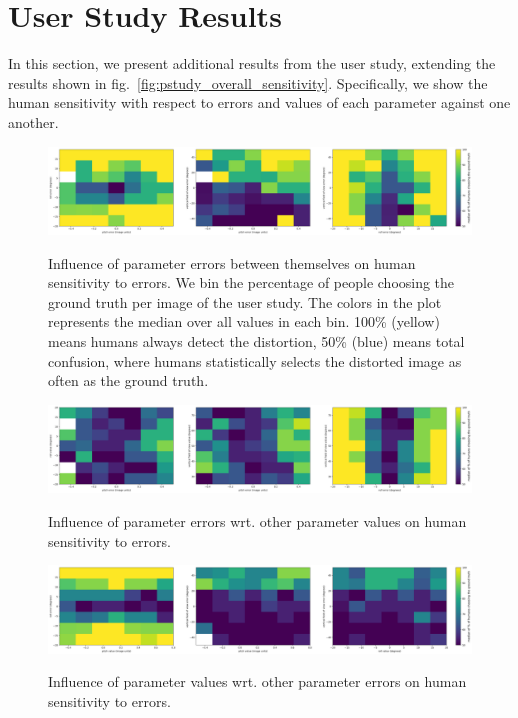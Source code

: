 \clearpage

\FloatBarrier

\protect\hypertarget{studyresults}{}{}

\hypertarget{user-study-results}{%
\section{User Study Results}\label{user-study-results}}

In this section, we present additional results from the user study,
extending the results shown in fig.~\ref{fig:pstudy_overall_sensitivity}. Specifically, we show the human
sensitivity with respect to errors and values of each parameter against
one another.

\begin{figure}[!ht]
\centering
\includegraphics[width=\linewidth]{study_results/hist2d_image_units_error_error.png}\\
\caption{Influence of parameter errors between themselves on human
sensitivity to errors. We bin the percentage of people choosing the
ground truth per image of the user study. The colors in the plot
represents the median over all values in each bin. 100\% (yellow) means
humans always detect the distortion, 50\% (blue) means total confusion,
where humans statistically selects the distorted image as often as the
ground truth.}
\end{figure}

\begin{figure}[!ht]
\centering
\includegraphics[width=\linewidth]{study_results/hist2d_image_units_error_value.png}\\
\caption{Influence of parameter errors wrt. other parameter values on
human sensitivity to errors.}
\end{figure}

\begin{figure}[!ht]
\centering
\includegraphics[width=\linewidth]{study_results/hist2d_image_units_value_error.png}\\
\caption{Influence of parameter values wrt. other parameter errors on
human sensitivity to errors.}
\end{figure}

